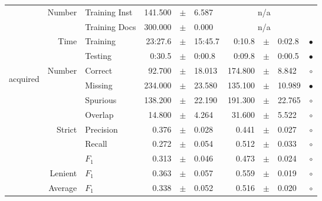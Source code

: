 \begin{longtable}{|r|r|l||rcl|rcl|c|}
\cline{2-10} & \multirow{2}{*}{    Number} &   Training Inst &     141.500 &  $\pm$  &       6.587 &    \multicolumn{3}{c|}{n/a}         &  \\
\cline{3-10} &                             &   Training Docs &     300.000 &  $\pm$  &       0.000 &    \multicolumn{3}{c|}{n/a}         &  \\
\cline{2-10} & \multirow{2}{*}{      Time} &        Training &     23:27.6 &  $\pm$  &     15:45.7 &      0:10.8 &  $\pm$  &      0:02.8 & $\bullet$ \\
\cline{3-10} &                             &         Testing &      0:30.5 &  $\pm$  &      0:00.8 &      0:09.8 &  $\pm$  &      0:00.5 & $\bullet$ \\
\hline
\hline
\multirow{11}{*}{\begin{sideways}acquired\end{sideways} }
             & \multirow{4}{*}{    Number} &         Correct &      92.700 &  $\pm$  &      18.013 &     174.800 &  $\pm$  &       8.842 & $\circ$ \\
\cline{3-10} &                             &         Missing &     234.000 &  $\pm$  &      23.580 &     135.100 &  $\pm$  &      10.989 & $\bullet$ \\
\cline{3-10} &                             &        Spurious &     138.200 &  $\pm$  &      22.190 &     191.300 &  $\pm$  &      22.765 & $\circ$ \\
\cline{3-10} &                             &         Overlap &      14.800 &  $\pm$  &       4.264 &      31.600 &  $\pm$  &       5.522 & $\circ$ \\
\cline{2-10} & \multirow{3}{*}{    Strict} &       Precision &       0.376 &  $\pm$  &       0.028 &       0.441 &  $\pm$  &       0.027 & $\circ$ \\
\cline{3-10} &                             &          Recall &       0.272 &  $\pm$  &       0.054 &       0.512 &  $\pm$  &       0.033 & $\circ$ \\
\cline{3-10} &                             &           $F_1$ &       0.313 &  $\pm$  &       0.046 &       0.473 &  $\pm$  &       0.024 & $\circ$ \\
\cline{2-10} &                     Lenient &           $F_1$ &       0.363 &  $\pm$  &       0.057 &       0.559 &  $\pm$  &       0.019 & $\circ$ \\
\cline{2-10} &                     Average &           $F_1$ &       0.338 &  $\pm$  &       0.052 &       0.516 &  $\pm$  &       0.020 & $\circ$ \\

\end{longtable}
